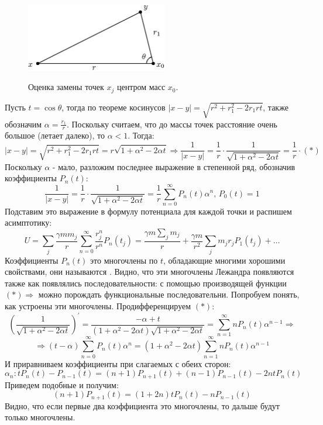 \documentclass[12pt]{article}
\theoremstyle{definition}
\newcommand{\ddsum}[2]{\displaystyle\sum\limits_{#1}^{#2}}
\begin{document}
\begin{figure}[H]
	\centering
	\includegraphics[width=0.55\textwidth]{MA3L18_4.eps}
	\label{MA3L18_4}
	\caption{Оценка замены точек $x_j$ центром масс $x_0$.}
	\label{fig:замена точек центром масс}
\end{figure}
Пусть $t = \cos{\theta}$, тогда по теореме косинусов $|x -y| = \sqrt{r^2 + r_1^2 - 2r_1 r t}$, также обозначим $\alpha = \tfrac{r_1}{r}$. Поскольку считаем, что до массы точек расстояние очень большое (летает далеко), то $\alpha <1$. Тогда:
$$
	|x - y| = \sqrt{r^2 + r_1^2 - 2r_1 r t} = r\sqrt{ 1 + \alpha^2 - 2\alpha t} \Rightarrow \dfrac{1}{|x - y|} = \dfrac{1}{r}{\cdot}\dfrac{1}{\sqrt{1 + \alpha^2 - 2\alpha t}} = \dfrac{1}{r}{\cdot}(*)
$$
Поскольку $\alpha$ - мало, разложим последнее выражение в степенной ряд, обозначив коэффициенты $P_n(t)$:
$$
	\dfrac{1}{|x - y|} = \dfrac{1}{r}{\cdot}\dfrac{1}{\sqrt{1 + \alpha^2 - 2\alpha t}} = \dfrac{1}{r}\ddsum{n = 0}{\infty}P_n(t)\alpha^n , \, P_0(t) = 1
$$
Подставим это выражение в формулу потенциала для каждой точки и распишем асимптотику:
$$
	U = \ddsum{j}{}\dfrac{\gamma m m_j}{r}\ddsum{n = 0}{\infty}\dfrac{r_j^n}{r^n}P_n(t_j) = \dfrac{\gamma m \sum\limits_{j}m_j}{r} + \dfrac{\gamma m }{r^2}\ddsum{j}{}m_j r_j P_1(t_j) + \dotsc
$$
Коэффициенты $P_n(t)$ это многочлены по $t$, обладающие многими хорошими свойствами, они называются . Видно, что эти многочлены Лежандра появляются также как появлялись последовательности: с помощью производящей функции $(*) \Rightarrow$ можно порождать функциональные последовательни. Попробуем понять, как устроены эти многочлены. Продифференцируем $(*)$:
$$
	\left(\dfrac{1}{\sqrt{1 + \alpha^2 - 2\alpha t}}\right)^\prime = \dfrac{-\alpha + t}{(1 + \alpha^2 - 2\alpha t)\sqrt{1 + \alpha^2 - 2\alpha t}} = \ddsum{n = 1}{\infty}nP_n(t)\alpha^{n-1 } \Rightarrow
$$
$$
	\Rightarrow (t-\alpha)\ddsum{n = 0}{\infty}P_n(t)\alpha^n = (1 + \alpha^2 - 2\alpha t)\ddsum{n = 1}{\infty}nP_n(t)\alpha^{n-1 }
$$
И приравниваем коэффициенты при слагаемых с обеих сторон:
$$
	\alpha_n \colon tP_n(t) - P_{n-1}(t) = (n + 1)P_{n+1}(t) + (n-1)P_{n-1}(t) - 2n tP_n(t)
$$
Приведем подобные и получим:
$$
	(n+1)P_{n+1}(t) = (1 + 2n)tP_n(t) - nP_{n-1}(t)
$$
Видно, что если первые два коэффициента это многочлены, то дальше будут только многочлены.
\end{document}
